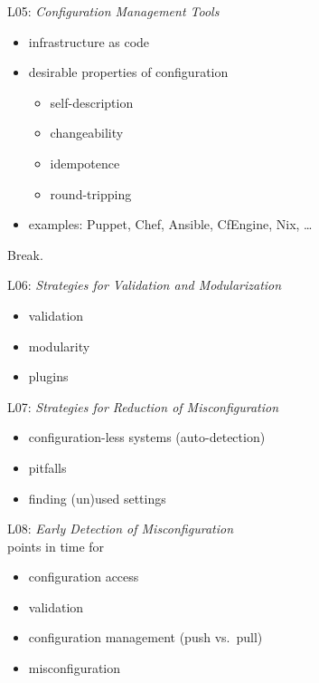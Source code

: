 \begin{frame}
	L05: \textit{Configuration Management Tools}
	\begin{itemize}
		\item infrastructure as code
		\item desirable properties of configuration
		\begin{itemize}
			\item self-description
			\item changeability
			\item idempotence
			\item round-tripping
		\end{itemize}
		\item examples: Puppet, Chef, Ansible, CfEngine, Nix, \dots
	\end{itemize}
\end{frame}

\begin{assignment}
	\begin{task}
	Break.
	\end{task}
\end{assignment}

\begin{frame}
	L06: \textit{Strategies for Validation and Modularization}
	\begin{itemize}
		\item validation
		\item modularity
		\item plugins
	\end{itemize}
\end{frame}

\begin{frame}
	L07: \textit{Strategies for Reduction of Misconfiguration}
	\begin{itemize}
		\item configuration-less systems (auto-detection)
		\item pitfalls
		\item finding (un)used settings
	\end{itemize}
\end{frame}

\begin{frame}
	L08: \textit{Early Detection of Misconfiguration}
	\\ \vspace{1cm}
	points in time for
	\begin{itemize}
		\item configuration access
		\item validation
		\item configuration management (push vs.\ pull)
		\item misconfiguration
	\end{itemize}
\end{frame}

